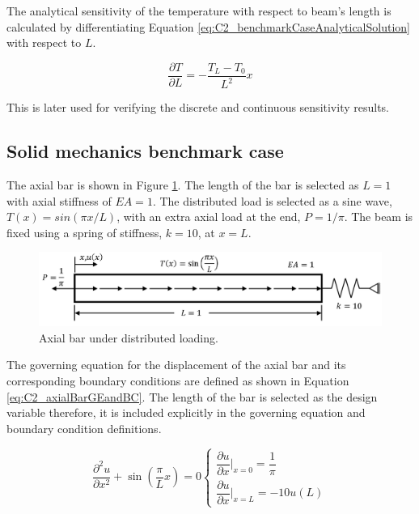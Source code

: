 The analytical sensitivity of the temperature with respect to beam's length is calculated by differentiating Equation \eqref{eq:C2_benchmarkCaseAnalyticalSolution} with respect to $L$.

\begin{equation}
	\frac{\partial T}{\partial L} = -\frac{T_L - T_0}{L^2} x
\end{equation}

This is later used for verifying the discrete and continuous sensitivity results.

\subsection{Solid mechanics benchmark case}\label{section:C2_solid_mechanics_benchmark}
The axial bar is shown in Figure \ref{fig:C2_axialBarPhysicalShape}. The length of the bar is selected as $L = 1$ with axial stiffness of $EA = 1$. The distributed load is selected as a sine wave, $T(x) = sin(\pi x/L)$, with an extra axial load at the end, $P = 1 / \pi$. The beam is fixed using a spring of stiffness, $k = 10$, at $x = L$.

\begin{figure}[h]
	\centering
	\includegraphics[width=14.00cm]{Chapter_2/figure/solid_mechanics_benchmark.png}
	\caption{Axial bar under distributed loading.}
	\label{fig:C2_axialBarPhysicalShape}
\end{figure}

The governing equation for the displacement of the axial bar and its corresponding boundary conditions are defined as shown in Equation \eqref{eq:C2_axialBarGEandBC}. The length of the bar is selected as the design variable therefore, it is included explicitly in the governing equation and boundary condition definitions.

\begin{subequations}
\begin{equation}\label{eq:C2_axialBarGE}
	\frac{\partial^2 u}{\partial x^2} + \sin \left( \frac{\pi}{L} x \right) = 0
\end{equation}
\begin{equation}\label{eq:C2_axialBarBC}
	\begin{cases}
	\dfrac{\partial u}{\partial x} \bigg|_{x = 0} = \dfrac{1}{\pi} \\
	\dfrac{\partial u}{\partial x} \bigg|_{x = L} = -10 u(L)
	\end{cases}
\end{equation}
\end{subequations}\label{eq:C2_axialBarGEandBC}


